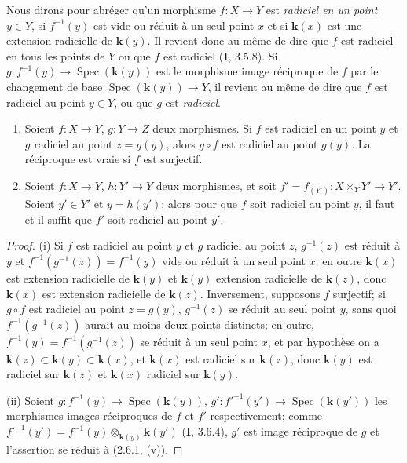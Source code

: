 \begin{env}[6.15.3]
\label{IV.2.s6.15.3-fr}
Nous dirons pour abréger qu'un morphisme $f:X\to Y$ est \emph{radiciel en
un point} $y\in Y$, si $f^{-1}(y)$ est vide ou réduit à un seul point $x$
et si $\boldsymbol{k}(x)$ est une extension radicielle de $\boldsymbol{k}(y)$. Il revient donc au
même de dire que $f$ est radiciel en tous les points de $Y$ ou que $f$ est
radiciel (\textbf{I}, 3.5.8). Si
$g:f^{-1}(y)\to\operatorname{Spec}(\boldsymbol{k}(y))$ est le morphisme image réciproque
de $f$ par le changement de base
$\operatorname{Spec}(\boldsymbol{k}(y))\to Y$, il revient au même de dire que $f$ est
radiciel au point $y\in Y$, ou que $g$ est \emph{radiciel}.
\end{env}

\begin{lemma}[6.15.3.1]
\label{IV.2.s6.15.3.1-fr}
\begin{enumerate}
\item[\textup{(i)}] Soient $f:X\to Y$, $g:Y\to Z$ deux morphismes. Si $f$ est
radiciel en un point $y$ et $g$ radiciel au point $z=g(y)$, alors $g\circ f$
est radiciel au point $g(y)$. La réciproque est vraie si $f$ est surjectif.
\item[\textup{(ii)}] Soient $f:X\to Y$, $h:Y'\to Y$ deux morphismes, et soit
$f'=f_{(Y')}:X\times_Y Y'\to Y'$. Soient $y'\in Y'$ et $y=h(y')$; alors
pour que $f$ soit radiciel au point $y$, il faut et il suffit que $f'$ soit
radiciel au point $y'$.
\end{enumerate}
\end{lemma}

\begin{proof}
(i) Si $f$ est radiciel au point $y$ et $g$ radiciel au point $z$,
$g^{-1}(z)$ est réduit à $y$ et
$f^{-1}(g^{-1}(z))=f^{-1}(y)$ vide ou réduit à un seul point $x$; en
outre $\boldsymbol{k}(x)$ est extension radicielle de $\boldsymbol{k}(y)$ et $\boldsymbol{k}(y)$ extension
radicielle de $\boldsymbol{k}(z)$, donc $\boldsymbol{k}(x)$ est extension radicielle de $\boldsymbol{k}(z)$.
Inversement, supposons $f$ surjectif; si $g\circ f$ est radiciel au point
$z=g(y)$, $g^{-1}(z)$ se réduit au seul point $y$, sans quoi
$f^{-1}(g^{-1}(z))$ aurait au moins deux points distincts; en outre,
$f^{-1}(y)=f^{-1}(g^{-1}(z))$ se réduit à un seul point $x$, et par
hypothèse on a $\boldsymbol{k}(z)\subset \boldsymbol{k}(y)\subset \boldsymbol{k}(x)$, et $\boldsymbol{k}(x)$ est radiciel sur
$\boldsymbol{k}(z)$, donc $\boldsymbol{k}(y)$ est radiciel sur $\boldsymbol{k}(z)$ et $\boldsymbol{k}(x)$ radiciel sur $\boldsymbol{k}(y)$.

(ii) Soient $g:f^{-1}(y)\to\operatorname{Spec}(\boldsymbol{k}(y))$,
$g':f'^{-1}(y')\to\operatorname{Spec}(\boldsymbol{k}(y'))$ les morphismes images
réciproques de $f$ et $f'$ respectivement; comme
$f'^{-1}(y')=f^{-1}(y)\otimes_{\mathbf{k}(y)}\boldsymbol{k}(y')$ (\textbf{I}, 3.6.4), $g'$ est image
réciproque de $g$ et l'assertion se réduit à (2.6.1, (v)).
\end{proof}

